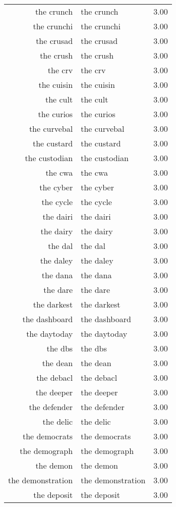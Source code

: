 \begin{table}[ht]
\begin{tabular}{rlr}
  the crunch & the crunch & 3.00 \\ 
  the crunchi & the crunchi & 3.00 \\ 
  the crusad & the crusad & 3.00 \\ 
  the crush & the crush & 3.00 \\ 
  the crv & the crv & 3.00 \\ 
  the cuisin & the cuisin & 3.00 \\ 
  the cult & the cult & 3.00 \\ 
  the curios & the curios & 3.00 \\ 
  the curvebal & the curvebal & 3.00 \\ 
  the custard & the custard & 3.00 \\ 
  the custodian & the custodian & 3.00 \\ 
  the cwa & the cwa & 3.00 \\ 
  the cyber & the cyber & 3.00 \\ 
  the cycle & the cycle & 3.00 \\ 
  the dairi & the dairi & 3.00 \\ 
  the dairy & the dairy & 3.00 \\ 
  the dal & the dal & 3.00 \\ 
  the daley & the daley & 3.00 \\ 
  the dana & the dana & 3.00 \\ 
  the dare & the dare & 3.00 \\ 
  the darkest & the darkest & 3.00 \\ 
  the dashboard & the dashboard & 3.00 \\ 
  the daytoday & the daytoday & 3.00 \\ 
  the dbs & the dbs & 3.00 \\ 
  the dean & the dean & 3.00 \\ 
  the debacl & the debacl & 3.00 \\ 
  the deeper & the deeper & 3.00 \\ 
  the defender & the defender & 3.00 \\ 
  the delic & the delic & 3.00 \\ 
  the democrats & the democrats & 3.00 \\ 
  the demograph & the demograph & 3.00 \\ 
  the demon & the demon & 3.00 \\ 
  the demonstration & the demonstration & 3.00 \\ 
  the deposit & the deposit & 3.00 \\ 

\end{tabular}
\end{table}

